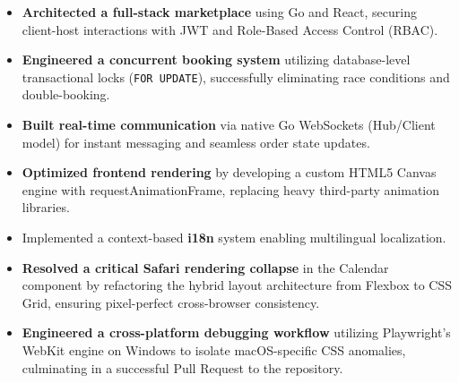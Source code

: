 \documentclass{resume}
\begin{document}
\begin{itemize}
  \item \textbf{Architected a full-stack marketplace} using Go and React, securing client-host interactions with JWT and Role-Based Access Control (RBAC).
  \item \textbf{Engineered a concurrent booking system} utilizing database-level transactional locks (\texttt{FOR UPDATE}), successfully eliminating race conditions and double-booking.
  \item \textbf{Built real-time communication} via native Go WebSockets (Hub/Client model) for instant messaging and seamless order state updates.
  \item \textbf{Optimized frontend rendering} by developing a custom HTML5 Canvas engine with requestAnimationFrame, replacing heavy third-party animation libraries.
  \item Implemented a context-based \textbf{i18n} system enabling multilingual localization.
\end{itemize}

\begin{itemize}
  \item \textbf{Resolved a critical Safari rendering collapse} in the Calendar component by refactoring the hybrid layout architecture from Flexbox to CSS Grid, ensuring pixel-perfect cross-browser consistency.
  \item \textbf{Engineered a cross-platform debugging workflow} utilizing Playwright's WebKit engine on Windows to isolate macOS-specific CSS anomalies, culminating in a successful Pull Request to the repository.
\end{itemize}

\end{document}
